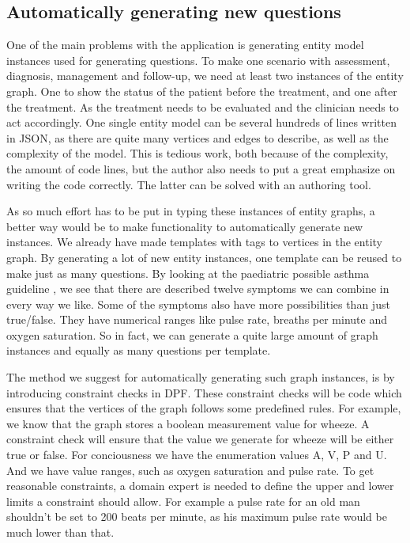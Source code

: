 \subsection{Automatically generating new questions}
One of the main problems with the application is generating entity model instances used for generating questions. To make one scenario with assessment, diagnosis, management and follow-up, we need at least two instances of the entity graph. One to show the status of the patient before the treatment, and one after the treatment. As the treatment needs to be evaluated and the clinician needs to act accordingly. One single entity model can be several hundreds of lines written in JSON, as there are quite many vertices and edges to describe, as well as the complexity of the model. This is tedious work, both because of the complexity, the amount of code lines, but the author also needs to put a great emphasize on writing the code correctly. The latter can be solved with an authoring tool.

As so much effort has to be put in typing these instances of entity graphs, a better way would be to make functionality to automatically generate new instances. We already have made templates with tags to vertices in the entity graph. By generating a lot of new entity instances, one template can be reused to make just as many questions. By looking at the paediatric possible asthma guideline \parencite{RepublicofKeny2016}, we see that there are described twelve symptoms we can combine in every way we like. Some of the symptoms also have more possibilities than just true/false. They have numerical ranges like pulse rate, breaths per minute and oxygen saturation. So in fact, we can generate a quite large amount of graph instances and equally as many questions per template.

The method we suggest for automatically generating such graph instances, is by introducing constraint checks in DPF. These constraint checks will be code which ensures that the vertices of the graph follows some predefined rules. For example, we know that the graph stores a boolean measurement value for wheeze. A constraint check will ensure that the value we generate for wheeze will be either true or false. For conciousness we have the enumeration values A, V, P and U. And we have value ranges, such as oxygen saturation and pulse rate. To get reasonable  constraints, a domain expert is needed to define the upper and lower limits a constraint should allow. For example a pulse rate for an old man shouldn't be set to 200 beats per minute, as his maximum pulse rate would be much lower than that.

